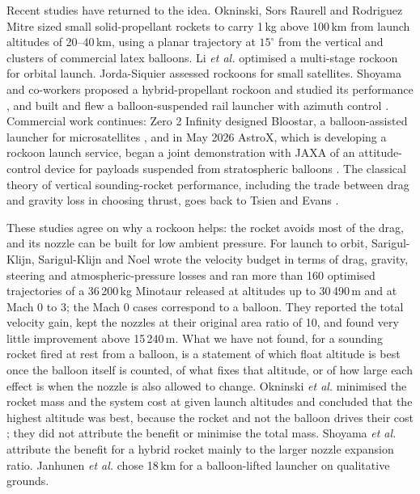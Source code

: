 \documentclass[11pt,a4paper]{article}
\begin{document}
Recent studies have returned to the idea. Okninski, Sors Raurell and Rodriguez Mitre \cite{okninski2016} sized small solid-propellant rockets to carry 1\,kg above 100\,km from launch altitudes of 20--40\,km, using a planar trajectory at $15^{\circ}$ from the vertical and clusters of commercial latex balloons. Li \emph{et al.} \cite{li2022} optimised a multi-stage rockoon for orbital launch. Jorda-Siquier \cite{jorda2012} assessed rockoons for small satellites. Shoyama and co-workers proposed a hybrid-propellant rockoon and studied its performance \cite{shoyama2022}, and built and flew a balloon-suspended rail launcher with azimuth control \cite{shoyama2021,shoyama2026}. Commercial work continues: Zero 2 Infinity designed Bloostar, a balloon-assisted launcher for microsatellites \cite{bloostar2015}, and in May 2026 AstroX, which is developing a rockoon launch service, began a joint demonstration with JAXA of an attitude-control device for payloads suspended from stratospheric balloons \cite{jaxa2026}. The classical theory of vertical sounding-rocket performance, including the trade between drag and gravity loss in choosing thrust, goes back to Tsien and Evans \cite{tsien1951}.

These studies agree on why a rockoon helps: the rocket avoids most of the drag, and its nozzle can be built for low ambient pressure. For launch to orbit, Sarigul-Klijn, Sarigul-Klijn and Noel \cite{sarigul2005} wrote the velocity budget in terms of drag, gravity, steering and atmospheric-pressure losses and ran more than 160 optimised trajectories of a 36\,200\,kg Minotaur released at altitudes up to 30\,490\,m and at Mach 0 to 3; the Mach 0 cases correspond to a balloon. They reported the total velocity gain, kept the nozzles at their original area ratio of 10, and found very little improvement above 15\,240\,m. What we have not found, for a sounding rocket fired at rest from a balloon, is a statement of which float altitude is best once the balloon itself is counted, of what fixes that altitude, or of how large each effect is when the nozzle is also allowed to change. Okninski \emph{et al.} minimised the rocket mass and the system cost at given launch altitudes and concluded that the highest altitude was best, because the rocket and not the balloon drives their cost \cite{okninski2016}; they did not attribute the benefit or minimise the total mass. Shoyama \emph{et al.} \cite{shoyama2022} attribute the benefit for a hybrid rocket mainly to the larger nozzle expansion ratio. Janhunen \emph{et al.} \cite{janhunen2018} chose 18\,km for a balloon-lifted launcher on qualitative grounds.
\end{document}
